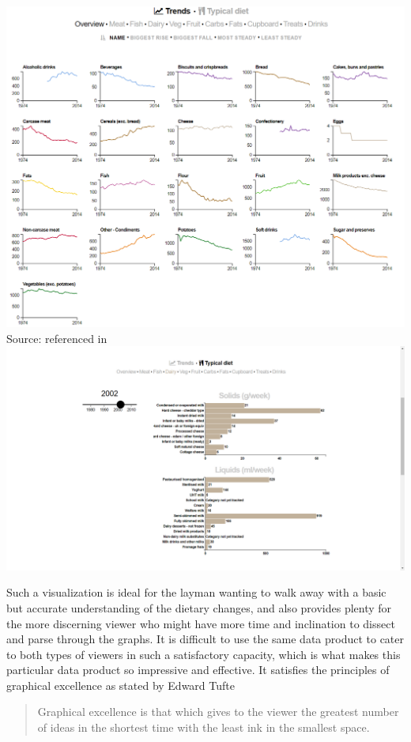\documentclass[]{book}
\theoremstyle{definition}
\theoremstyle{definition}
\theoremstyle{definition}
\theoremstyle{remark}
\begin{document}
\includegraphics{images/britain-diet-data-trends.PNG} Source:
\citep{britain-diet-data-trends} referenced in \citep{britain_diet_2016}
\includegraphics{images/britain-diet-data-typical_diet.png}

Such a visualization is ideal for the layman wanting to walk away with a
basic but accurate understanding of the dietary changes, and also
provides plenty for the more discerning viewer who might have more time
and inclination to dissect and parse through the graphs. It is difficult
to use the same data product to cater to both types of viewers in such a
satisfactory capacity, which is what makes this particular data product
so impressive and effective. It satisfies the principles of graphical
excellence as stated by Edward Tufte \citep{visual_display}

\begin{quote}
Graphical excellence is that which gives to the viewer the greatest
number of ideas in the shortest time with the least ink in the smallest
space.
\end{quote}
\end{document}

